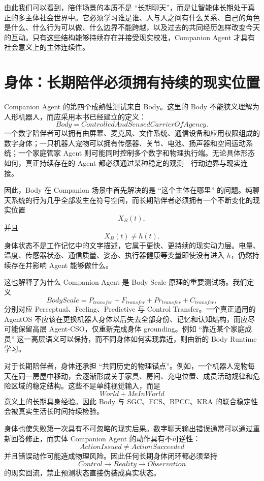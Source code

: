 由此我们可以看到，陪伴场景的本质不是 ``长期聊天''，而是让智能体长期处于真正的多主体社会世界中。它必须学习谁是谁、人与人之间有什么关系、自己的角色是什么、什么行为可以做、什么边界不能跨越，以及过去的共同经历怎样改变今天的互动。只有这些结构能够持续存在并接受现实校准，Companion Agent 才具有社会意义上的主体连续性。

\section{身体：长期陪伴必须拥有持续的现实位置}

Companion Agent 的第四个成熟性测试来自 Body。这里的 Body 不能狭义理解为人形机器人，而应采用本书已经建立的定义：
\[
\boxed{
Body
=
ControlledAndSensedCarrierOfAgency .
}
\]
一个数字陪伴者可以拥有由屏幕、麦克风、文件系统、通信设备和应用权限组成的数字身体；一只机器人宠物可以拥有传感器、关节、电池、扬声器和空间运动系统；一个家庭管家 Agent 则可能同时控制多个数字和物理执行端。无论具体形态如何，真正持续存在的 Agent 都必须通过某种稳定的观测---行动边界与现实连接。

因此，Body 在 Companion 场景中首先解决的是 ``这个主体在哪里'' 的问题。纯聊天系统的行为几乎全部发生在符号空间，而长期陪伴者必须拥有一个不断变化的现实位置
\[
X_B(t),
\]
并且
\[
X_B(t)\neq h(t).
\]
身体状态不是工作记忆中的文字描述，它属于更快、更持续的现实动力层。电量、温度、传感器状态、通信质量、姿态、执行器健康等变量即使没有进入 $h$，仍然持续存在并影响 Agent 能够做什么。

这也解释了为什么 Companion Agent 是 Body Scale 原理的重要测试场。我们定义
\[
BodyScale
=
P_{transfer}
+
F_{transfer}
+
Pr_{transfer}
+
C_{transfer},
\]
分别对应 Perceptual、Feeling、Predictive 与 Control Transfer。一个真正通用的 AgentOS 不应该在更换机器人身体以后失去全部身份、记忆和认知结构，而应尽可能保留高层 Agent-CSO，仅重新完成身体 grounding。例如 ``靠近某个家庭成员'' 这一高层语义可以保持，而不同身体如何实现靠近，则由新的 Body Runtime 学习。

对于长期陪伴者，身体还承担 ``共同历史的物理锚点''。例如，一个机器人宠物每天在同一房屋中移动，会逐渐形成关于家具、房间、充电位置、成员活动规律和危险区域的稳定结构。这些不是单纯视觉输入，而是
\[
World+MeInWorld
\]
意义上的长期具身经验。因此 Body 与 SGC、FCS、BPCC、KRA 的联合稳定性会被真实生活长时间持续检验。

身体也使失败第一次具有不可忽略的现实后果。数字聊天输出错误通常可以通过重新回答修正，而实体 Companion Agent 的动作具有不可逆性：
\[
ActionIssued
\neq
ActionSucceeded
\]
并且错误动作可能造成物理风险。因此任何长期身体闭环都必须坚持
\[
Control
\rightarrow
Reality
\rightarrow
Observation
\]
的现实回流，禁止预测状态直接伪装成真实状态。

